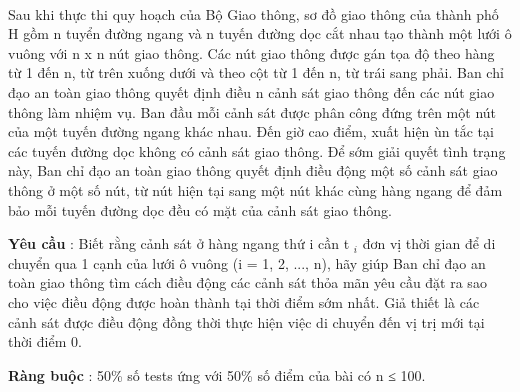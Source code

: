  

Sau khi thực thi quy hoạch của Bộ Giao thông, sơ đồ giao thông của thành phố H gồm n tuyển đường ngang và n tuyến đường dọc cắt nhau tạo thành một lưới ô vuông với n x n nút giao thông. Các nút giao thông được gán tọa độ theo hàng từ 1 đến n, từ trên xuống dưới và theo cột từ 1 đến n, từ trái sang phải. Ban chỉ đạo an toàn giao thông quyết định điều n cảnh sát giao thông đến các nút giao thông làm nhiệm vụ. Ban đầu mỗi cảnh sát được phân công đứng trên một nút của một tuyến đường ngang khác nhau. Đến giờ cao điểm, xuất hiện ùn tắc tại các tuyến đường dọc không có cảnh sát giao thông. Để sớm giải quyết tình trạng này, Ban chỉ đạo an toàn giao thông quyết định điều động một số cảnh sát giao thông ở một số nút, từ nút hiện tại sang một nút khác cùng hàng ngang để đảm bảo mỗi tuyến đường dọc đều có mặt của cảnh sát giao thông.

\textbf{Yêu cầu } : Biết rằng cảnh sát ở hàng ngang thứ i cần t $_ i $ đơn vị thời gian để di chuyển qua 1 cạnh của lưới ô vuông (i = 1, 2, ..., n), hãy giúp Ban chỉ đạo an toàn giao thông tìm cách điều động các cảnh sát thỏa mãn yêu cầu đặt ra sao cho việc điều động được hoàn thành tại thời điểm sớm nhất. Giả thiết là các cảnh sát được điều động đồng thời thực hiện việc di chuyển đến vị trị mới tại thời điểm 0.

\textbf{Ràng buộc } : 50\% số tests ứng với 50\% số điểm của bài có n ≤ 100.

\